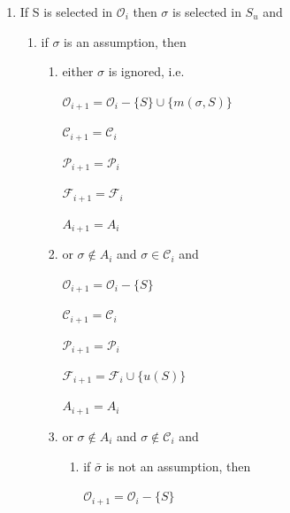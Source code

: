 \begin{defn}
\begin{enumerate}
\begin{enumerate}
\begin{multicols}{3}
$\mathcal{P}_{i+1}=\mathcal{P}_i - \{\sigma\} \cup (R-A_i)$

$\mathcal{O}_{i+1}=\mathcal{O}_i$

\columnbreak

$A_{i+1}=A_i \cup (A \cap R)$

$\mathcal{F}_{i+1}=\mathcal{F}_i$

\columnbreak

$\mathcal{C}_{i+1}=\mathcal{C}_i$

\end{multicols}
\end{enumerate}
\item If S is selected in $\mathcal{O}_i$ then $\sigma$ is selected in $S_u$ and
\begin{enumerate}
\item if $\sigma$ is an assumption, then
\begin{enumerate}
\item either $\sigma$ is ignored, i.e.
\begin{multicols}{3}
$\mathcal{O}_{i+1}=\mathcal{O}_i-\{S\}\cup\{m(\sigma,S)\}$

$\mathcal{C}_{i+1}=\mathcal{C}_i$

\columnbreak

$\mathcal{P}_{i+1}=\mathcal{P}_i$

$\mathcal{F}_{i+1}=\mathcal{F}_i$

\columnbreak

$A_{i+1}=A_i$

\end{multicols}
\item or $\sigma \notin A_i$ and $\sigma \in \mathcal{C}_i$ and
\begin{multicols}{3}
$\mathcal{O}_{i+1}=\mathcal{O}_i-\{S\}$

$\mathcal{C}_{i+1}=\mathcal{C}_i$

\columnbreak

$\mathcal{P}_{i+1}=\mathcal{P}_i$

$\mathcal{F}_{i+1}=\mathcal{F}_i \cup \{u(S)\}$

\columnbreak

$A_{i+1}=A_i$

\end{multicols}
\item or $\sigma \notin A_i$ and $\sigma \notin \mathcal{C}_i$ and
\begin{enumerate}
\item if $\bar{\sigma}$ is not an assumption, then
\begin{multicols}{3}
$\mathcal{O}_{i+1}=\mathcal{O}_i-\{S\}$


\end{multicols}
\end{enumerate}
\end{enumerate}
\end{enumerate}
\end{enumerate}
\end{defn}
